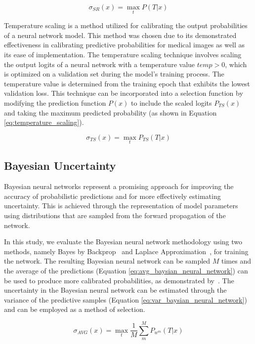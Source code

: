 \begin{equation}
	\sigma_{SR}(x) = \max_{t} P(T|x)
	\label{eq:softmax_response}
\end{equation}

Temperature scaling is a method utilized for calibrating the output probabilities of a neural network model. This method was chosen due to its demonstrated effectiveness in calibrating predictive probabilities for medical images as well as its ease of implementation. The temperature scaling technique involves scaling the output logits of a neural network with a temperature value $temp > 0$, which is optimized on a validation set during the model's training process. The temperature value is determined from the training epoch that exhibits the lowest validation loss. This technique can be incorporated into a selection function by modifying the prediction function $P(x)$ to include the scaled logits $P_{TS}(x)$ and taking the maximum predicted probability (as shown in Equation \ref{eq:temperature_scaling}).

\begin{equation}
	\sigma_{TS}(x) = \max_t P_{TS}(T|x)
	\label{eq:selective_temperature_scaling}
\end{equation}

\subsection{Bayesian Uncertainty}
\label{subsec:selective_uncertainity}
Bayesian neural networks represent a promising approach for improving the accuracy of probabilistic predictions and for more effectively estimating uncertainty. This is achieved through the representation of model parameters using distributions that are sampled from the forward propagation of the network.

In this study, we evaluate the Bayesian neural network methodology using two methods, namely Bayes by Backprop~\citep{blundell2015weight} and Laplace Approximation~\citep{mackay1992bayesian}, for training the network. The resulting Bayesian neural network can be sampled $M$ times and the average of the predictions (Equation \ref{eq:avg_baysian_neural_network}) can be used to produce more calibrated probabilities, as demonstrated by~\citep{jospin2020hands}. The uncertainty in the Bayesian neural network can be estimated through the variance of the predictive samples (Equation \ref{eq:var_baysian_neural_network}) and can be employed as a method of selection.

\begin{equation}
	\sigma_{AVG}(x) = \max_t \frac{1}{M} \sum_m^M P_{w^m}(T|x)
	\label{eq:avg_baysian_neural_network}
\end{equation}

